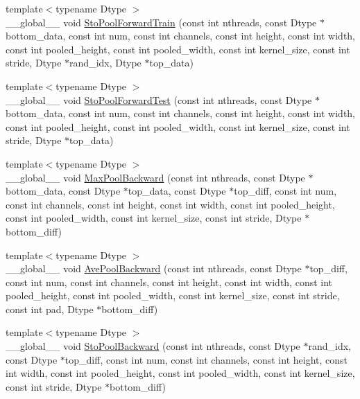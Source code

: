\begin{DoxyCompactItemize}
\item 
{\footnotesize template$<$typename Dtype $>$ }\\\+\_\+\+\_\+global\+\_\+\+\_\+ void \hyperlink{namespacecaffe_aecd2fb4a16d7a1864dc9774cf8035264}{Sto\+Pool\+Forward\+Train} (const int nthreads, const Dtype $\ast$bottom\+\_\+data, const int num, const int channels, const int height, const int width, const int pooled\+\_\+height, const int pooled\+\_\+width, const int kernel\+\_\+size, const int stride, Dtype $\ast$rand\+\_\+idx, Dtype $\ast$top\+\_\+data)
\item 
{\footnotesize template$<$typename Dtype $>$ }\\\+\_\+\+\_\+global\+\_\+\+\_\+ void \hyperlink{namespacecaffe_ad9cf8043e680796318b7bad79c2bc481}{Sto\+Pool\+Forward\+Test} (const int nthreads, const Dtype $\ast$bottom\+\_\+data, const int num, const int channels, const int height, const int width, const int pooled\+\_\+height, const int pooled\+\_\+width, const int kernel\+\_\+size, const int stride, Dtype $\ast$top\+\_\+data)
\item 
{\footnotesize template$<$typename Dtype $>$ }\\\+\_\+\+\_\+global\+\_\+\+\_\+ void \hyperlink{namespacecaffe_a22c07bd08af73d0383ddb0b74ae72534}{Max\+Pool\+Backward} (const int nthreads, const Dtype $\ast$bottom\+\_\+data, const Dtype $\ast$top\+\_\+data, const Dtype $\ast$top\+\_\+diff, const int num, const int channels, const int height, const int width, const int pooled\+\_\+height, const int pooled\+\_\+width, const int kernel\+\_\+size, const int stride, Dtype $\ast$bottom\+\_\+diff)
\item 
{\footnotesize template$<$typename Dtype $>$ }\\\+\_\+\+\_\+global\+\_\+\+\_\+ void \hyperlink{namespacecaffe_a646a1381b87e6f26e1535cfe0c11283d}{Ave\+Pool\+Backward} (const int nthreads, const Dtype $\ast$top\+\_\+diff, const int num, const int channels, const int height, const int width, const int pooled\+\_\+height, const int pooled\+\_\+width, const int kernel\+\_\+size, const int stride, const int pad, Dtype $\ast$bottom\+\_\+diff)
\item 
{\footnotesize template$<$typename Dtype $>$ }\\\+\_\+\+\_\+global\+\_\+\+\_\+ void \hyperlink{namespacecaffe_a28ecc3c20dad2a7c95e8432f30ba30ae}{Sto\+Pool\+Backward} (const int nthreads, const Dtype $\ast$rand\+\_\+idx, const Dtype $\ast$top\+\_\+diff, const int num, const int channels, const int height, const int width, const int pooled\+\_\+height, const int pooled\+\_\+width, const int kernel\+\_\+size, const int stride, Dtype $\ast$bottom\+\_\+diff)

\end{DoxyCompactItemize}
